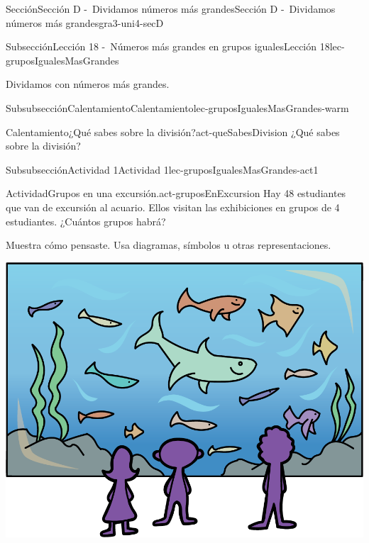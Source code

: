 \documentclass[twoside,10pt,]{article}
\begin{document}
\begin{sectionptx}{Sección}{Sección D -~Dividamos números más grandes}{}{Sección D -~Dividamos números más grandes}{}{}{gra3-uni4-secD}
%
%
\typeout{************************************************}
\typeout{************************************************}
%
\begin{subsectionptx}{Subsección}{Lección 18 -~Números más grandes en grupos iguales}{}{Lección 18}{}{}{lec-gruposIgualesMasGrandes}
\begin{introduction}{}%
Dividamos con números más grandes.%
\end{introduction}%
%
%
\typeout{************************************************}
\typeout{************************************************}
%
\begin{subsubsectionptx}{Subsubsección}{Calentamiento}{}{Calentamiento}{}{}{lec-gruposIgualesMasGrandes-warm}
\begin{exploration}{Calentamiento}{¿Qué sabes sobre la división?}{act-queSabesDivision}%
¿Qué sabes sobre la división?%
\end{exploration}%
\end{subsubsectionptx}
%
%
\typeout{************************************************}
\typeout{************************************************}
%
\begin{subsubsectionptx}{Subsubsección}{Actividad 1}{}{Actividad 1}{}{}{lec-gruposIgualesMasGrandes-act1}
\begin{activity}{Actividad}{Grupos en una excursión.}{act-gruposEnExcursion}%
Hay 48 estudiantes que van de excursión al acuario. Ellos visitan las exhibiciones en grupos de 4 estudiantes. ¿Cuántos grupos habrá?%
\par
Muestra cómo pensaste. Usa diagramas, símbolos u otras representaciones.%
\begin{image}{0.15}{0.7}{0.15}{}%
\includegraphics[width=\linewidth]{external/png-source/CS 3.4 Lesson 18 Activity 1.png}

\end{image}
\end{activity}
\end{subsubsectionptx}
\end{subsectionptx}
\end{sectionptx}
\end{document}
